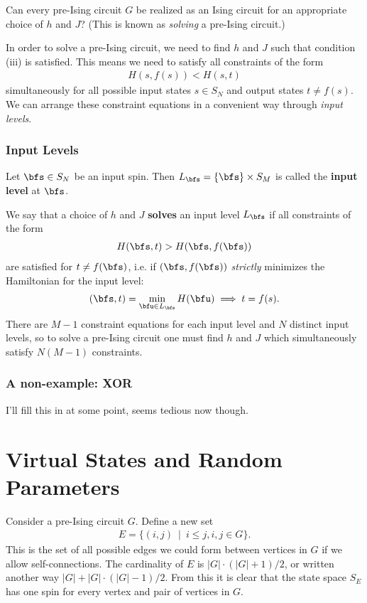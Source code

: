 \documentclass[raggedright, nofonts, notitlepage, openany, debug]{tufte-book}
\begin{document}
\begin{question}\label{q:can-you-always-zingify}
  Can every pre-Ising circuit $G$ be realized as an Ising circuit for an appropriate choice of $h$ and $J$? (This is known as \emph{solving} a pre-Ising circuit.)
\end{question}

In order to solve a pre-Ising circuit, we need to find $h$ and $J$ such that condition (iii) is satisfied. This means we need to satisfy all constraints of the form
\begin{align*}
  H(s,f(s)) < H(s,t)
\end{align*}
simultaneously for all possible input states $s \in S_N$ and output states $t \neq f(s)$. We can arrange these constraint equations in a convenient way through \emph{input levels}.
\subsection{Input Levels}
\begin{defn}
  Let $\bfs \in S_N$ be an input spin. Then $L_{\bfs} = \{\bfs\}\times S_M$ is called the \textbf{input level} at $\bfs$.
\end{defn}
We say that a choice of $h$ and $J$ \textbf{solves} an input level $L_\bfs$ if all constraints of the form
\begin{align*}
  H(\bfs,t) > H(\bfs,f(\bfs))
\end{align*}
are satisfied for $t \neq f(\bfs)$, i.e. if $(\bfs, f(\bfs))$ \emph{strictly} minimizes the Hamiltonian for the input level:
\begin{align*}
  (\bfs,t) = \min_{\bfu \in L_\bfs} H(\bfu) \implies t = f(s).
\end{align*}
There are $M-1$ constraint equations for each input level and $N$ distinct input levels, so to solve a pre-Ising circuit one must find $h$ and $J$ which simultaneously satisfy $N(M-1)$ constraints.

\subsection{A non-example: XOR}
I'll fill this in at some point, seems tedious now though.


\chapter{Virtual States and Random Parameters}
Consider a pre-Ising circuit $G$. Define a new set
\begin{align*}
  E = \{(i,j) ~ \mid ~ i \leq j, i,j \in G\}.
\end{align*}
This is the set of all possible edges we could form between vertices in $G$ if we allow self-connections. The cardinality of $E$ is $|G|\cdot(|G|+1)/2$, or written another way $|G| + |G|\cdot(|G|-1)/2$. From this it is clear that the state space $S_E$ has one spin for every vertex and pair of vertices in $G$. 
\end{document}
